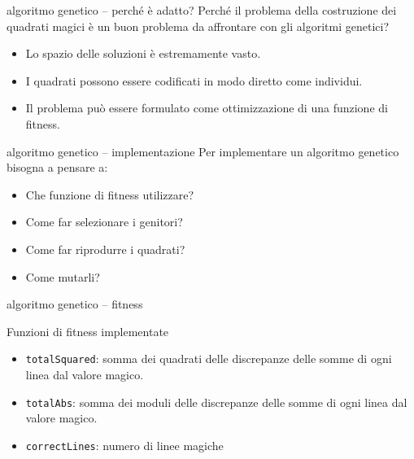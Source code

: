 \documentclass[10pt]{beamer}
\begin{document}
\begin{frame}{algoritmo genetico -- perché è adatto?}
	Perché il problema della costruzione dei quadrati magici è un buon problema da affrontare con gli algoritmi genetici?
	\begin{itemize}
		\item Lo spazio delle soluzioni è estremamente vasto.
		\item I quadrati possono essere codificati in modo diretto come individui.
		\item Il problema può essere formulato come ottimizzazione di una funzione di fitness.
	\end{itemize}
\end{frame}

\begin{frame}{algoritmo genetico -- implementazione}
	Per implementare un algoritmo genetico bisogna a pensare a:
	\begin{itemize}
		\item Che funzione di fitness utilizzare?
		\item Come far selezionare i genitori?
		\item Come far riprodurre i quadrati?
		\item Come mutarli?
	\end{itemize}
\end{frame}

\begin{frame}{algoritmo genetico -- fitness}
	\begin{block}{Funzioni di fitness implementate}
	\parbox{0.98\columnwidth}{
		\begin{itemize}
		\item \texttt{totalSquared}: somma dei quadrati delle discrepanze delle somme di ogni linea dal valore magico.
		\item \texttt{totalAbs}: somma dei moduli delle discrepanze delle somme di ogni linea dal valore magico.
		\item \texttt{correctLines}: numero di linee magiche
		\end{itemize}
	}
	\end{block}
\end{frame}
\end{document}
